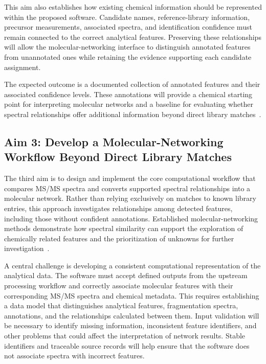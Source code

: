         This aim also establishes how existing chemical information should be represented within the proposed software. Candidate names, reference-library information, precursor measurements, associated spectra, and identification confidence must remain connected to the correct analytical features. Preserving these relationships will allow the molecular-networking interface to distinguish annotated features from unannotated ones while retaining the evidence supporting each candidate assignment.

        The expected outcome is a documented collection of annotated features and their associated confidence levels. These annotations will provide a chemical starting point for interpreting molecular networks and a baseline for evaluating whether spectral relationships offer additional information beyond direct library matches~\cite{Chao2025}.

    \subsection{Aim 3: Develop a Molecular-Networking Workflow Beyond Direct Library Matches}\label{subsec:aim-three}

        The third aim is to design and implement the core computational workflow that compares MS/MS spectra and converts supported spectral relationships into a molecular network. Rather than relying exclusively on matches to known library entries, this approach investigates relationships among detected features, including those without confident annotations. Established molecular-networking methods demonstrate how spectral similarity can support the exploration of chemically related features and the prioritization of unknowns for further investigation~\cite{Wang2016,Nothias2020,Ernst2019}.

        A central challenge is developing a consistent computational representation of the analytical data. The software must accept defined outputs from the upstream processing workflow and correctly associate molecular features with their corresponding MS/MS spectra and chemical metadata. This requires establishing a data model that distinguishes analytical features, fragmentation spectra, annotations, and the relationships calculated between them. Input validation will be necessary to identify missing information, inconsistent feature identifiers, and other problems that could affect the interpretation of network results. Stable identifiers and traceable source records will help ensure that the software does not associate spectra with incorrect features.

